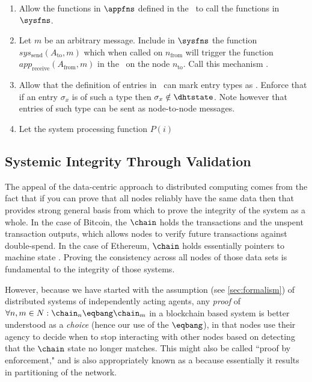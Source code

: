 \documentclass[twocolumn,showpacs,%
  nofootinbib,aps,superscriptaddress,%
  eqsecnum,prd,notitlepage,showkeys,10pt]{revtex4-1}
\begin{document}
\begin{enumerate}
\item Allow the functions in $\appfns$ defined in the \hcdna\ to call the functions in $\sysfns$.
\item Let $m$ be an arbitrary message. Include in $\sysfns$ the function $sys_\text{send}(A_\text{to},m)$ which when called on $n_\text{from}$ will trigger the function $app_\text{receive}(A_\text{from},m)$ in the \hcdna\ on the node $n_\text{to}$. Call this mechanism .
\item \label{private} Allow that the definition of entries in \hcdna\ can mark entry types as . Enforce that if an entry $\sigma_x$ is of such a type then $\sigma_x \notin \dhtstate$. Note however that entries of such type can be sent as node-to-node messages.
\item Let the system processing function $P(i)$ 
\end{enumerate}

\subsection{Systemic Integrity Through Validation}
\label{sec:integrity}

The appeal of the data-centric approach to distributed computing comes from the fact that if you can prove that all nodes reliably have the same data then that provides strong general basis from which to prove the integrity of the system as a whole.  In the case of Bitcoin, the $\chain$ holds the transactions and the unspent transaction outputs, which allows nodes to verify future transactions against double-spend. In the case of Ethereum, $\chain$ holds essentially pointers to machine state . Proving the consistency across all nodes of those data sets is fundamental to the integrity of those systems.

However, because we have started with the assumption (see \ref{sec:formalism}) of distributed systems of independently acting agents, any \textit{proof} of  $\forall n,m \in N: \chain_n\eqbang\chain_m$ in a blockchain based system is better understood as a \textit{choice} (hence our use of the $\eqbang$),  in that nodes use their agency to decide when to stop interacting with other nodes based on detecting that the $\chain$ state no longer matches.  This might also be called  ``proof by enforcement," and is also appropriately known as a  because essentially it results in partitioning of the network.
\end{document}
